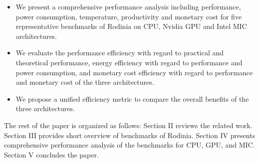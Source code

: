   
\begin{itemize}    
\item  We present a comprehensive performance analysis including performance, power consumption, temperature, productivity and monetary cost for five representative benchmarks of Rodinia on CPU, Nvidia GPU and Intel MIC architectures.    
\item  We evaluate the performance efficiency with regard to practical and theoretical performance, energy efficiency with regard to performance and power consumption, and monetary cost efficiency with regard to performance and monetary cost of the three architectures.    
\item  We propose a unified efficiency metric to compare the overall benefits of the three architectures.
\end{itemize}

The rest of the paper is organized as follows: Section II reviews the related work. %
Section III provides short overview of benchmarks of Rodinia. Section IV presents comprehensive performance analysis of the benchmarks for CPU, GPU, and MIC. Section V concludes the paper.
